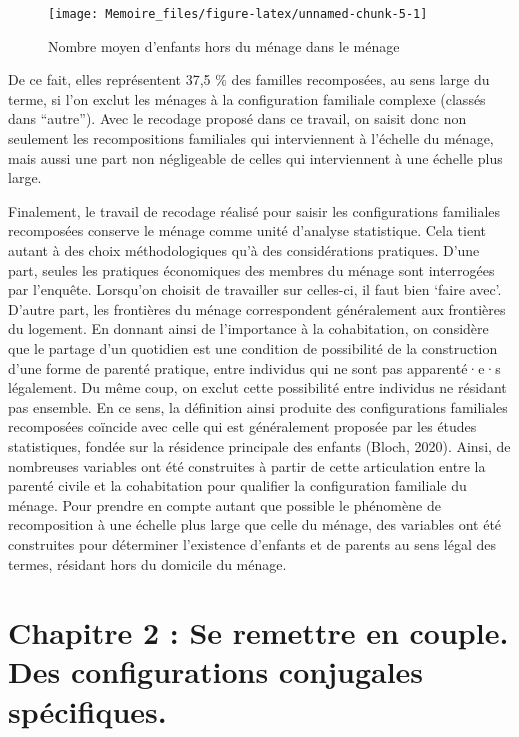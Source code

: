 \documentclass[
  12pt,
]{book}
\begin{document}
\begin{figure}[h]

{\centering \texttt{[image: Memoire\_files/figure-latex/unnamed-chunk-5-1]} 

}

\caption{Nombre moyen d'enfants hors du ménage dans le ménage}\label{fig:unnamed-chunk-5}
\end{figure}

De ce fait, elles représentent 37,5 \% des familles recomposées, au sens
large du terme, si l'on exclut les ménages à la configuration familiale
complexe (classés dans ``autre''). Avec le recodage proposé dans ce
travail, on saisit donc non seulement les recompositions familiales qui
interviennent à l'échelle du ménage, mais aussi une part non négligeable
de celles qui interviennent à une échelle plus large.

Finalement, le travail de recodage réalisé pour saisir les
configurations familiales recomposées conserve le ménage comme unité
d'analyse statistique. Cela tient autant à des choix méthodologiques
qu'à des considérations pratiques. D'une part, seules les pratiques
économiques des membres du ménage sont interrogées par l'enquête.
Lorsqu'on choisit de travailler sur celles-ci, il faut bien `faire
avec'. D'autre part, les frontières du ménage correspondent généralement
aux frontières du logement. En donnant ainsi de l'importance à la
cohabitation, on considère que le partage d'un quotidien est une
condition de possibilité de la construction d'une forme de parenté
pratique, entre individus qui ne sont pas apparenté·e·s légalement. Du
même coup, on exclut cette possibilité entre individus ne résidant pas
ensemble. En ce sens, la définition ainsi produite des configurations
familiales recomposées coïncide avec celle qui est généralement proposée
par les études statistiques, fondée sur la résidence principale des
enfants (Bloch, 2020). Ainsi, de nombreuses variables ont été
construites à partir de cette articulation entre la parenté civile et la
cohabitation pour qualifier la configuration familiale du ménage. Pour
prendre en compte autant que possible le phénomène de recomposition à
une échelle plus large que celle du ménage, des variables ont été
construites pour déterminer l'existence d'enfants et de parents au sens
légal des termes, résidant hors du domicile du ménage.

\chapter{Chapitre 2 : Se remettre en couple. Des configurations
conjugales
spécifiques.}\label{chapitre-2-se-remettre-en-couple.-des-configurations-conjugales-spuxe9cifiques.}
\end{document}
